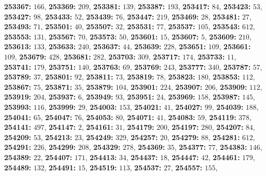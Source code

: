 \textsf{\bfseries 253367:} $166$, \textsf{\bfseries 253369:} $209$, \textsf{\bfseries 253381:} $139$, \textsf{\bfseries 253387:} $193$, \textsf{\bfseries 253417:} $84$, \textsf{\bfseries 253423:} $53$, \textsf{\bfseries 253427:} $98$, \textsf{\bfseries 253433:} $52$, \textsf{\bfseries 253439:} $76$, \textsf{\bfseries 253447:} $219$, \textsf{\bfseries 253469:} $28$, \textsf{\bfseries 253481:} $27$, \textsf{\bfseries 253493:} $71$, \textsf{\bfseries 253501:} $40$, \textsf{\bfseries 253507:} $32$, \textsf{\bfseries 253531:} $77$, \textsf{\bfseries 253537:} $105$, \textsf{\bfseries 253543:} $612$, \textsf{\bfseries 253553:} $131$, \textsf{\bfseries 253567:} $70$, \textsf{\bfseries 253573:} $50$, \textsf{\bfseries 253601:} $15$, \textsf{\bfseries 253607:} $5$, \textsf{\bfseries 253609:} $210$, \textsf{\bfseries 253613:} $133$, \textsf{\bfseries 253633:} $240$, \textsf{\bfseries 253637:} $44$, \textsf{\bfseries 253639:} $228$, \textsf{\bfseries 253651:} $109$, \textsf{\bfseries 253661:} $109$, \textsf{\bfseries 253679:} $428$, \textsf{\bfseries 253681:} $282$, \textsf{\bfseries 253703:} $309$, \textsf{\bfseries 253717:} $174$, \textsf{\bfseries 253733:} $11$, \textsf{\bfseries 253741:} $179$, \textsf{\bfseries 253751:} $140$, \textsf{\bfseries 253763:} $69$, \textsf{\bfseries 253769:} $243$, \textsf{\bfseries 253777:} $340$, \textsf{\bfseries 253787:} $57$, \textsf{\bfseries 253789:} $37$, \textsf{\bfseries 253801:} $92$, \textsf{\bfseries 253811:} $73$, \textsf{\bfseries 253819:} $78$, \textsf{\bfseries 253823:} $180$, \textsf{\bfseries 253853:} $112$, \textsf{\bfseries 253867:} $75$, \textsf{\bfseries 253871:} $35$, \textsf{\bfseries 253879:} $104$, \textsf{\bfseries 253901:} $224$, \textsf{\bfseries 253907:} $206$, \textsf{\bfseries 253909:} $112$, \textsf{\bfseries 253919:} $204$, \textsf{\bfseries 253937:} $6$, \textsf{\bfseries 253949:} $93$, \textsf{\bfseries 253951:} $24$, \textsf{\bfseries 253969:} $158$, \textsf{\bfseries 253987:} $145$, \textsf{\bfseries 253993:} $116$, \textsf{\bfseries 253999:} $29$, \textsf{\bfseries 254003:} $153$, \textsf{\bfseries 254021:} $41$, \textsf{\bfseries 254027:} $99$, \textsf{\bfseries 254039:} $188$, \textsf{\bfseries 254041:} $65$, \textsf{\bfseries 254047:} $76$, \textsf{\bfseries 254053:} $80$, \textsf{\bfseries 254071:} $41$, \textsf{\bfseries 254083:} $59$, \textsf{\bfseries 254119:} $378$, \textsf{\bfseries 254141:} $497$, \textsf{\bfseries 254147:} $2$, \textsf{\bfseries 254161:} $31$, \textsf{\bfseries 254179:} $200$, \textsf{\bfseries 254197:} $280$, \textsf{\bfseries 254207:} $84$, \textsf{\bfseries 254209:} $53$, \textsf{\bfseries 254213:} $23$, \textsf{\bfseries 254249:} $329$, \textsf{\bfseries 254257:} $20$, \textsf{\bfseries 254279:} $88$, \textsf{\bfseries 254281:} $612$, \textsf{\bfseries 254291:} $226$, \textsf{\bfseries 254299:} $208$, \textsf{\bfseries 254329:} $278$, \textsf{\bfseries 254369:} $35$, \textsf{\bfseries 254377:} $77$, \textsf{\bfseries 254383:} $146$, \textsf{\bfseries 254389:} $22$, \textsf{\bfseries 254407:} $171$, \textsf{\bfseries 254413:} $34$, \textsf{\bfseries 254437:} $18$, \textsf{\bfseries 254447:} $42$, \textsf{\bfseries 254461:} $179$, \textsf{\bfseries 254489:} $132$, \textsf{\bfseries 254491:} $15$, \textsf{\bfseries 254519:} $113$, \textsf{\bfseries 254537:} $27$, \textsf{\bfseries 254557:} $155$, 
